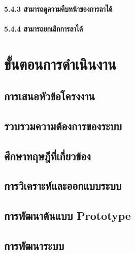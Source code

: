\hspace{2.5cm}\paragraph{5.4.3 สามารถดูความคืบหน้าของการลาได้}

\hspace{2.5cm}\paragraph{5.4.4 สามารถยกเลิกการลาได้}





\section{ขั้นตอนการดำเนินงาน}

\hspace{0cm}\subsection{การเสนอหัวข้อโครงงาน}

\hspace{0cm}\subsection{รวบรวมความต้องการของระบบ}

\hspace{0cm}\subsection{ศึกษาทฤษฎีที่เกี่ยวข้อง}

\hspace{0cm}\subsection{การวิเคราะห์และออกแบบระบบ}

\hspace{0cm}\subsection{การพัฒนาต้นแบบ Prototype}

\hspace{0cm}\subsection{การพัฒนาระบบ}

